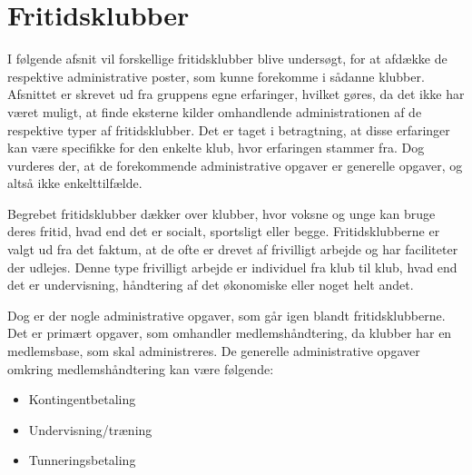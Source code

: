 \chapter{Fritidsklubber} \label{chap:Fritidsklubber}

I følgende afsnit vil forskellige fritidsklubber blive undersøgt, for at afdække de respektive administrative poster, som kunne forekomme i sådanne klubber. 
Afsnittet er skrevet ud fra gruppens egne erfaringer, hvilket gøres, da det ikke har været muligt, at finde eksterne kilder omhandlende administrationen af de respektive typer af fritidsklubber.  
Det er taget i betragtning, at disse erfaringer kan være specifikke for den enkelte klub, hvor erfaringen stammer fra. 
Dog vurderes der, at de forekommende administrative opgaver er generelle opgaver, og altså ikke enkelttilfælde.

Begrebet fritidsklubber dækker over klubber, hvor voksne og unge kan bruge deres fritid, hvad end det er socialt, sportsligt eller begge. 
Fritidsklubberne er valgt ud fra det faktum, at de ofte er drevet af frivilligt arbejde og har faciliteter der udlejes. 
Denne type frivilligt arbejde er individuel fra klub til klub, hvad end det er undervisning, håndtering af det økonomiske eller noget helt andet. 

Dog er der nogle administrative opgaver, som går igen blandt fritidsklubberne.
Det er primært opgaver, som omhandler medlemshåndtering, da klubber har en medlemsbase, som skal administreres. 
De generelle administrative opgaver omkring medlemshåndtering kan være følgende:
\begin{itemize}
	\item Kontingentbetaling
	\item Undervisning/træning
	\item Tunneringsbetaling
\end{itemize}


